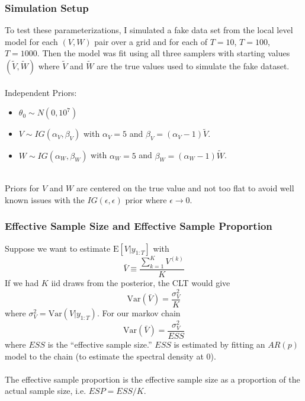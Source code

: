 \documentclass[xcolor=dvipsnames]{beamer}\usepackage{graphicx, color}
\begin{document}
\begin{frame}
  \frametitle{Simulation Setup}

To test these parameterizations, I simulated a fake data set from the local level model for each $(V,W)$ pair over a grid and for each of $T=10$, $T=100$, $T=1000$. Then the model was fit using all three samplers with starting values $(\tilde{V},\tilde{W})$ where $\tilde{V}$ and $\tilde{W}$ are the true values used to simulate the fake dataset.\\~\\

Independent Priors:
\begin{itemize}
\item $\theta_0\sim N(0, 10^7)$
\item $V\sim IG(\alpha_V, \beta_V)$ with $\alpha_V=5$ and $\beta_V=(\alpha_V - 1)\tilde{V}$.
\item $W\sim IG(\alpha_W, \beta_W)$ with $\alpha_W=5$ and $\beta_W=(\alpha_W - 1)\tilde{W}$.\\~\\
\end{itemize}

Priors for $V$ and $W$ are centered on the true value and not too flat to avoid well known issues with the $IG(\epsilon, \epsilon)$ prior where $\epsilon\to0$.


\end{frame}

\begin{frame}
  \frametitle{Effective Sample Size and Effective Sample Proportion}
  Suppose we want to estimate $\mathrm{E}[V|y_{1:T}]$ with 
  \[
  \bar{V}\equiv\frac{\textstyle\sum_{k=1}^KV^{(k)}}{K}
  \]
  If we had $K$ iid draws from the posterior, the CLT would give 
  \[
  \mathrm{Var}(\bar{V})=\frac{\sigma_V^2}{K}
  \]
where $\sigma_V^2=\mathrm{Var}(V|y_{1:T})$. For our markov chain 
\[
\mathrm{Var}(\bar{V})=\frac{\sigma^2_V}{ESS}
\]
where $ESS$ is the ``effective sample size.'' $ESS$ is estimated by fitting an $AR(p)$ model to the chain (to estimate the spectral density at 0). \\~\\
  
  The effective sample proportion is the effective sample size as a proportion of the actual sample size, i.e. $ESP=ESS/K$.
\end{frame}
\end{document}
